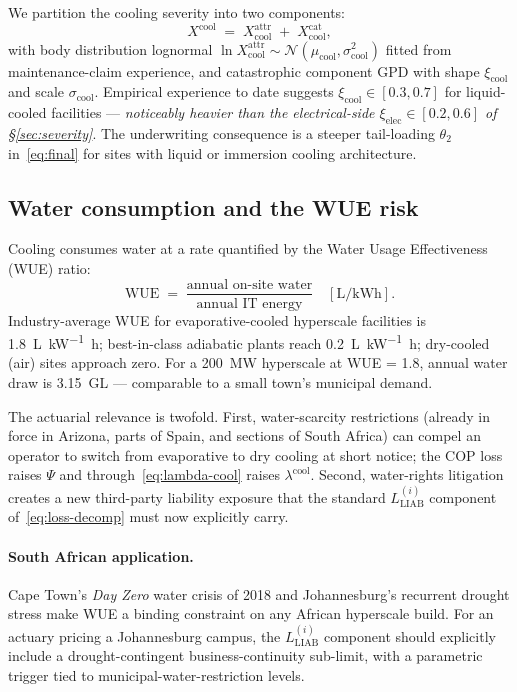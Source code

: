 We partition the cooling severity into two components:
\begin{equation}\label{eq:cool-sev}
   X^{\mathrm{cool}} \;=\;
   X^{\mathrm{attr}}_{\mathrm{cool}} \;+\; X^{\mathrm{cat}}_{\mathrm{cool}},
\end{equation}
with body distribution lognormal $\ln X^{\mathrm{attr}}_{\mathrm{cool}}
\sim \mathcal{N}(\mu_{\mathrm{cool}},\sigma_{\mathrm{cool}}^2)$
fitted from maintenance-claim experience, and catastrophic component
GPD with shape $\xi_{\mathrm{cool}}$ and scale $\sigma_{\mathrm{cool}}$.
Empirical experience to date suggests
$\xi_{\mathrm{cool}}\in [0.3, 0.7]$ for liquid-cooled facilities ---
\emph{noticeably heavier than the electrical-side
$\xi_{\mathrm{elec}}\in[0.2,0.6]$ of \S\ref{sec:severity}}. The
underwriting consequence is a steeper tail-loading
$\theta_2$ in~\eqref{eq:final} for sites with liquid or immersion
cooling architecture.

\subsection{Water consumption and the WUE risk}\label{ss:cool-wue}

Cooling consumes water at a rate quantified by the Water Usage
Effectiveness (WUE) ratio:
\begin{equation}\label{eq:WUE}
   \mathrm{WUE} \;=\; \frac{\text{annual on-site water}}{\text{annual IT energy}}
   \quad [\mathrm{L/kWh}].
\end{equation}
Industry-average WUE for evaporative-cooled hyperscale facilities is
\SI{1.8}{\liter\per\kilo\watt\hour}; best-in-class adiabatic plants
reach \SI{0.2}{\liter\per\kilo\watt\hour}; dry-cooled (air) sites
approach zero. For a \SI{200}{\mega\watt} hyperscale at WUE = 1.8,
annual water draw is \SI{3.15}{\giga\liter} --- comparable to a
small town's municipal demand.

The actuarial relevance is twofold. First, water-scarcity
restrictions (already in force in Arizona, parts of Spain, and
sections of South Africa) can compel an operator to switch from
evaporative to dry cooling at short notice; the
COP loss raises $\Psi$ and through~\eqref{eq:lambda-cool} raises
$\lambda^{\mathrm{cool}}$. Second, water-rights litigation creates a
new third-party liability exposure that the standard
$L^{(i)}_{\mathrm{LIAB}}$ component of~\eqref{eq:loss-decomp} must now
explicitly carry.

\paragraph{South African application.} Cape Town's \emph{Day Zero}
water crisis of 2018 and Johannesburg's recurrent drought stress
make WUE a binding constraint on any African hyperscale build.
For an actuary pricing a Johannesburg campus, the
$L^{(i)}_{\mathrm{LIAB}}$ component should explicitly include a
drought-contingent business-continuity sub-limit, with a parametric
trigger tied to municipal-water-restriction levels.

